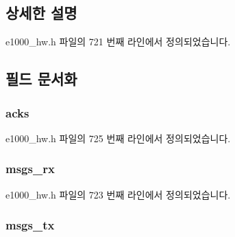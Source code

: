 \subsection{상세한 설명}


e1000\+\_\+hw.\+h 파일의 721 번째 라인에서 정의되었습니다.



\subsection{필드 문서화}
\subsubsection[{\texorpdfstring{acks}{acks}}]{ acks}\hypertarget{structe1000__mbx__stats_a4d601ec397f4331533f384ec8116ea18}{}\label{structe1000__mbx__stats_a4d601ec397f4331533f384ec8116ea18}


e1000\+\_\+hw.\+h 파일의 725 번째 라인에서 정의되었습니다.

\subsubsection[{\texorpdfstring{msgs\+\_\+rx}{msgs_rx}}]{ msgs\+\_\+rx}\hypertarget{structe1000__mbx__stats_adc756db482d038e31b7a7be66d4acda8}{}\label{structe1000__mbx__stats_adc756db482d038e31b7a7be66d4acda8}


e1000\+\_\+hw.\+h 파일의 723 번째 라인에서 정의되었습니다.

\subsubsection[{\texorpdfstring{msgs\+\_\+tx}{msgs_tx}}]{ msgs\+\_\+tx}\hypertarget{structe1000__mbx__stats_a7a1c5341e66657eec3cb5009ff5a483a}{}\label{structe1000__mbx__stats_a7a1c5341e66657eec3cb5009ff5a483a}


